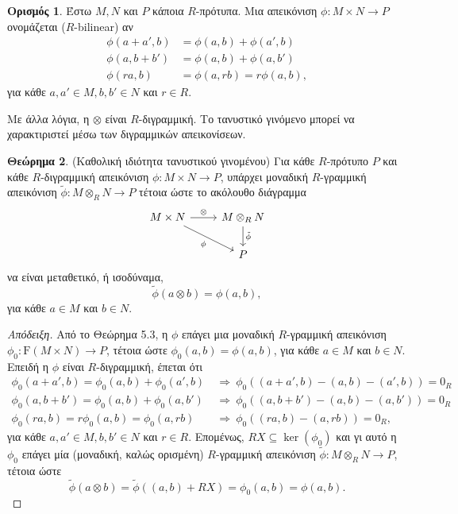\documentclass[12pt,a4paper,reqno]{amsart}
\theoremstyle{definition}
\newtheorem{theorem}{Θεώρημα}
\newtheorem{definition}[theorem]{Ορισμός}
\theoremstyle{remark}
\numberwithin{theorem}{section}
\numberwithin{exercise}{section}
\numberwithin{equation}{section}
\newcommand{\rmF}{\mathrm{F}}
\renewcommand{\to}{\rightarrow}
\newcommand{\then}{\Rightarrow}
\newcommand{\defn}[1]{{\color{mylightblue}{#1}}}
\begin{document}
\begin{definition}
    \label{def:bilinear}
    Έστω $M, N$ και $P$ κάποια $R$-πρότυπα. Μια απεικόνιση $\phi : M \times N \to P$ ονομάζεται \defn{$R$-διγραμμική} ($R$-bilinear) αν 
    \begin{align*}
        \phi(a + a', b) &= \phi(a,b) + \phi(a',b) \\
        \phi(a, b+b') &= \phi(a,b) + \phi(a,b') \\
        \phi(ra,b) &= \phi(a,rb) = r \phi(a,b),
    \end{align*}
    για κάθε $a, a' \in M, b, b' \in N$ και $r \in R$.
\end{definition}

Με άλλα λόγια, η $\otimes$ είναι $R$-διγραμμική. Το τανυστικό γινόμενο μπορεί να χαρακτιριστεί μέσω των διγραμμικών απεικονίσεων. 
\begin{theorem}{\rm(Καθολική ιδιότητα τανυστικού γινομένου)}
    \label{thm:UP_tensorProduct}
    Για κάθε $R$-πρότυπο $P$ και κάθε $R$-διγραμμική απεικόνιση $\phi : M\times N \to P$, υπάρχει μοναδική $R$-γραμμική απεικόνιση $\tilde{\phi} : M \otimes_R N \to P$ τέτοια ώστε το ακόλουθο διάγραμμα  
    \[
    \begin{tikzcd}
    M \times N \arrow[r, "\otimes"] \arrow[dr, "\phi"'] & M \otimes_R N \arrow[d, "\tilde{\phi}"] \\
                                           & P
    \end{tikzcd}
    \]
    να είναι μεταθετικό, ή ισοδύναμα, 
    \[
    \tilde{\phi}(a \otimes b) = \phi(a,b),
    \] 
    για κάθε $a \in M$ και $b \in N$.
\end{theorem}

\begin{proof}[Απόδειξη]
    Από το Θεώρημα 5.3, η $\phi$ επάγει μια μοναδική $R$-γραμμική απεικόνιση $\phi_0 : \rmF(M\times N) \to P$, τέτοια ώστε $\phi_0(a,b) = \phi(a,b)$, για κάθε $a \in M$ και $b \in N$. Επειδή η $\phi$ είναι $R$-διγραμμική, έπεται ότι 
    \begin{align*}
    \phi_0(a+a',b) = \phi_0(a,b) + \phi_0(a',b) \ &\then \ \phi_0((a+a',b)-(a,b)-(a',b)) = 0_R \\
    \phi_0(a,b+b') = \phi_0(a,b) + \phi_0(a,b') \ &\then \ \phi_0((a,b+b')-(a,b)-(a,b')) = 0_R \\
    \phi_0(ra,b) = r\phi_0(a,b) = \phi_0(a,rb) \ &\then \ \phi_0((ra,b)-(a,rb)) = 0_R, 
    \end{align*}
    για κάθε $a, a' \in M, b, b' \in N$ και $r \in R$. Επομένως, $RX \subseteq \ker(\phi_0)$ και γι αυτό η $\phi_0$ επάγει μία (μοναδική, καλώς ορισμένη) $R$-γραμμική απεικόνιση $\tilde{\phi} : M \otimes_R N \to P$, τέτοια ώστε 
    \[
    \tilde{\phi}(a \otimes b) = \tilde{\phi}\left((a,b) + RX\right) = \phi_0(a,b) = \phi(a,b).
    \]
\end{proof}
\end{document}
